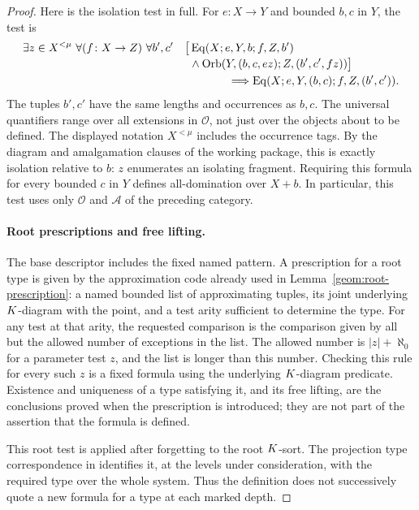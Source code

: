 \begin{proof}
Here is the isolation test in full.  For $e\colon X\to Y$ and bounded
$b,c$ in $Y$, the test is
\begin{align*}
 \exists z\in X^{<\mu}\ \forall (f\colon X\to Z)\ \forall b',c'\quad
 \bigl[&\operatorname{Eq}(X;e,Y,b;f,Z,b')\\[-2pt]
 &{}\land\operatorname{Orb}
       (Y,(b,c,e z);Z,(b',c',f z))\bigr]\\
 &\hspace{12mm}\Longrightarrow
       \operatorname{Eq}(X;e,Y,(b,c);f,Z,(b',c')).
\end{align*}
The tuples $b',c'$ have the same lengths and occurrences as $b,c$.
The universal quantifiers range over all extensions in $\mathcal O$,
not just over the objects about to be defined.  The displayed notation
$X^{<\mu}$ includes the occurrence tags.  By the diagram and amalgamation
clauses of the working package, this is exactly isolation relative to
$b$: $z$ enumerates an isolating fragment.  Requiring this formula for
every bounded $c$ in $Y$ defines all-domination over $X+b$.  In particular,
this test uses only $\mathcal O$ and $\mathcal A$ of the preceding
category.

\paragraph{Root prescriptions and free lifting.}
The base descriptor includes the fixed named pattern.  A prescription
for a root type is given by the approximation code already used in
Lemma~\ref{geom:root-prescription}: a named bounded list of approximating
tuples, its joint underlying $K$-diagram with the point, and a test
arity sufficient to determine the type.  For any test at that arity,
the requested comparison is the comparison given by all but the allowed
number of exceptions in the list.  The allowed number is
$|z|+\aleph_0$ for a parameter test $z$, and the list is longer than this
number.  Checking this rule for every such $z$ is a fixed formula using
the underlying $K$-diagram predicate.  Existence and uniqueness of a
type satisfying it, and its free lifting, are the conclusions proved
when the prescription is introduced; they are not part of the assertion
that the formula is defined.

This root test is applied after forgetting to the root $K$-sort.
The projection type correspondence in
 identifies it, at the levels under
consideration, with the required type over the whole system.  Thus the
definition does not successively quote a new formula for a type at each
marked depth.


\end{proof}
